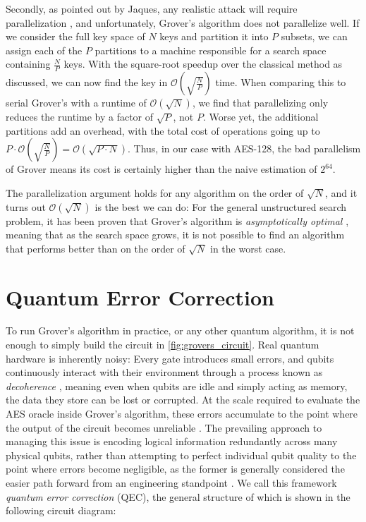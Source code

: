 Secondly, as pointed out by Jaques, any realistic attack will require parallelization \cite{jaques2024ches_presentation}, and unfortunately, Grover's algorithm does not parallelize well. If we consider the full key space of $N$ keys and partition it into $P$ subsets, we can assign each of the $P$ partitions to a machine responsible for a search space containing $\frac{N}{P}$ keys. With the square-root speedup over the classical method as discussed, we can now find the key in $\mathcal{O}(\sqrt{\frac{N}{P}})$ time. When comparing this to serial Grover's with a runtime of $\mathcal{O}(\sqrt{N})$, we find that parallelizing only reduces the runtime by a factor of $\sqrt{P}$, not $P$. Worse yet, the additional partitions add an overhead, with the total cost of operations going up to $P \cdot \mathcal{O}(\sqrt{\frac{N}{P}}) = \mathcal{O}(\sqrt{P \cdot N})$. Thus, in our case with AES-128, the bad parallelism of Grover means its cost is certainly higher than the naive estimation of $2^{64}$. 

The parallelization argument holds for any algorithm on the order of $\sqrt{N}$, and it turns out $\mathcal{O}(\sqrt{N})$ is the best we can do: For the general unstructured search problem, it has been proven that Grover's algorithm is \emph{asymptotically optimal} \cite{Bennett_1997, Zalka_1999}, meaning that as the search space grows, it is not possible to find an algorithm that performs better than on the order of $\sqrt{N}$ in the worst case. %

\section{Quantum Error Correction}\label{sec:QEC}
To run Grover's algorithm in practice, or any other quantum algorithm, it is not enough to simply build the circuit in \cref{fig:grovers_circuit}. Real quantum hardware is inherently noisy: Every gate introduces small errors, and qubits continuously interact with their environment through a process known as \emph{decoherence} \cite{decoherence}, meaning even when qubits are idle and simply acting as memory, the data they store can be lost or corrupted. At the scale required to evaluate the AES oracle inside Grover's algorithm, these errors accumulate to the point where the output of the circuit becomes unreliable \cite{jaques2024ches_presentation}. The prevailing approach to managing this issue is encoding logical information redundantly across many physical qubits, rather than attempting to perfect individual qubit quality to the point where errors become negligible, as the former is generally considered the easier path forward from an engineering standpoint \cite{jaques2024ches_presentation}. We call this framework \emph{quantum error correction} (QEC), the general structure of which is shown in the following circuit diagram:

